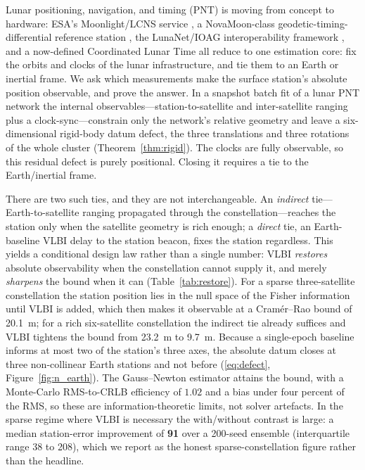 Lunar positioning, navigation, and timing (PNT) is moving from concept to
hardware: ESA's Moonlight/LCNS service
\citep{esa_moonlight,telespazio2024moonlight}, a NovaMoon-class
geodetic-timing-differential reference station \citep{molli2026novamoon}, the
LunaNet/IOAG interoperability framework \citep{nasa2025lnis}, and a now-defined
Coordinated Lunar Time \citep{iau2024lcrs,ashby2024lunartime} all reduce to one
estimation core: fix the orbits and clocks of the lunar infrastructure, and tie
them to an Earth or inertial frame. We ask which measurements make the surface
station's absolute position observable, and prove the answer. In a snapshot batch
fit of a lunar PNT network the internal observables---station-to-satellite and
inter-satellite ranging plus a clock-sync---constrain only the network's relative
geometry and leave a six-dimensional rigid-body datum defect, the three
translations and three rotations of the whole cluster (Theorem~\ref{thm:rigid}).
The clocks are fully observable, so this residual defect is purely positional.
Closing it requires a tie to the Earth/inertial frame.

There are two such ties, and they are not interchangeable. An \emph{indirect}
tie---Earth-to-satellite ranging propagated through the constellation---reaches
the station only when the satellite geometry is rich enough; a \emph{direct} tie,
an Earth-baseline VLBI delay to the station beacon, fixes the station regardless.
This yields a conditional design law rather than a single number: VLBI
\emph{restores} absolute observability when the constellation cannot supply it,
and merely \emph{sharpens} the bound when it can (Table~\ref{tab:restore}). For a
sparse three-satellite constellation the station position lies in the null space
of the Fisher information until VLBI is added, which then makes it observable at a
Cram\'er--Rao bound of \SI{20.1}{\meter}; for a rich six-satellite constellation
the indirect tie already suffices and VLBI tightens the bound from
\SI{23.2}{\meter} to \SI{9.7}{\meter}. Because a single-epoch baseline informs at
most two of the station's three axes, the absolute datum closes at three
non-collinear Earth stations and not before (\eqref{eq:defect},
Figure~\ref{fig:n_earth}). The Gauss--Newton estimator attains the bound, with a
Monte-Carlo RMS-to-CRLB efficiency of $1.02$ and a bias under four percent of the
RMS, so these are information-theoretic limits, not solver artefacts. In the
sparse regime where VLBI is necessary the with/without contrast is large: a
median station-error improvement of \textbf{91} over a 200-seed ensemble
(interquartile range 38 to 208), which we report as the honest sparse-constellation
figure rather than the headline.

